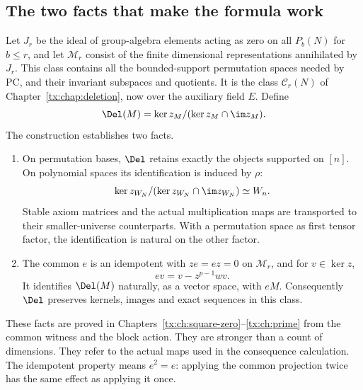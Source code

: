 \documentclass[11pt,a4paper,oneside,openany]{book}
\theoremstyle{definition}\newtheorem{definition}[theorem]{Definition}
\theoremstyle{remark}\newtheorem{remark}[theorem]{Remark}
\numberwithin{equation}{chapter}
\begin{document}
\subsection{The two facts that make the formula work}
Let $J_r$ be the ideal of group-algebra elements acting as zero on all
$P_b(N)$ for $b\le r$, and let $\mathcal M_r$ consist of the finite
dimensional representations annihilated by $J_r$. This class contains
all the bounded-support permutation spaces needed by PC, and their
invariant subspaces and quotients. It is the class $\mathcal C_r(N)$
of Chapter~\ref{tx:chap:deletion}, now over the auxiliary field $E$.
Define
\[
               \Del(M)=\ker z_M/(\ker z_M\cap\im z_M).
\]
The construction establishes two facts.
\begin{enumerate}
\item On permutation bases, $\Del$ retains exactly the objects supported
on $[n]$. On polynomial spaces its identification is induced by $\rho$:
\[
 \ker z_{W_N}/(\ker z_{W_N}\cap\im z_{W_N})\simeq W_n.
\]
Stable axiom matrices and the actual multiplication maps are transported
to their smaller-universe counterparts. With a permutation space as
first tensor factor, the identification is natural on the other factor.
\item The common $e$ is an idempotent with $ze=ez=0$ on
$\mathcal M_r$, and for $v\in\ker z$,
\begin{equation}\label{tx:lift-eq:onker}
                             ev=v-z^{p-1}wv.
\end{equation}
It identifies $\Del(M)$ naturally, as a vector space, with $eM$.
Consequently $\Del$ preserves kernels, images and exact sequences in
this class.
\end{enumerate}
These facts are proved in
Chapters~\ref{tx:ch:square-zero}--\ref{tx:ch:prime} from the common
witness and the block action. They are stronger than a count of dimensions. They refer to
the actual maps used in the consequence calculation.
The idempotent property means $e^2=e$: applying the common projection
twice has the same effect as applying it once.
\end{document}
